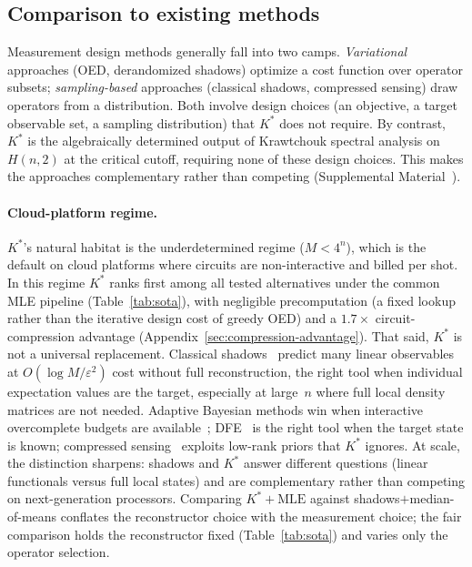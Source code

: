 \documentclass[twocolumn,prx,aps,superscriptaddress,longbibliography,floatfix]{revtex4-2}
\begin{document}
\subsection{Comparison to existing methods}
\label{sec:comparison}

Measurement design methods generally fall into two camps.
\emph{Variational} approaches (OED, derandomized shadows)
optimize a cost function over operator subsets;
\emph{sampling-based} approaches (classical shadows, compressed
sensing) draw operators from a distribution.
Both involve design choices (an objective, a target observable set,
a sampling distribution) that $K^*$ does not require.
By contrast, $K^*$ is the algebraically determined output of
Krawtchouk spectral analysis on~$H(n,2)$ at the critical cutoff,
requiring none of these design choices.
This makes the approaches complementary rather than competing
(Supplemental Material~\cite{supplemental}).

\paragraph{Cloud-platform regime.}
$K^*$'s natural habitat is the underdetermined regime
($M < 4^n$), which is the default on cloud platforms where
circuits are non-interactive and billed per shot.
In this regime $K^*$ ranks first among all tested alternatives
under the common MLE pipeline (Table~\ref{tab:sota}), with
negligible precomputation (a fixed lookup rather than the
iterative design cost of greedy OED) and a $1.7\times$
circuit-compression advantage
(Appendix~\ref{sec:compression-advantage}).
That said, $K^*$ is not a universal replacement.
Classical shadows~\cite{Huang2020} predict many linear
observables at $O(\log M / \varepsilon^2)$ cost without full
reconstruction, the right tool when individual expectation values
are the target, especially at large~$n$ where full
local density matrices are not needed.
Adaptive Bayesian methods win when
interactive overcomplete budgets are
available~\cite{Huszar2012,HuangZhu2025,Lange2023};
DFE~\cite{Flammia2011} is the right tool when the target state is
known; compressed sensing~\cite{Gross2010} exploits low-rank priors
that $K^*$ ignores.
At scale, the distinction sharpens: shadows and $K^*$ answer
different questions (linear functionals versus full local
states) and are complementary rather than competing on
next-generation processors.  Comparing $K^*{+}\text{MLE}$ against
shadows${+}$median-of-means conflates the reconstructor choice
with the measurement choice; the fair comparison holds the
reconstructor fixed (Table~\ref{tab:sota}) and varies only the
operator selection.
\end{document}
